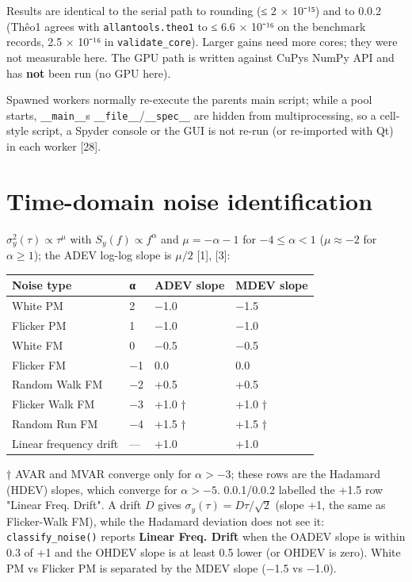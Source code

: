 \documentclass[10pt,a4paper]{article}
\begin{document}
Results are identical to the serial path to rounding (≤ 2 × 10⁻¹⁵) and to
0.0.2 (Thêo1 agrees with \texttt{allantools.\allowbreak{}theo1} to ≤ 6.6 × 10⁻¹⁶ on the benchmark
records, 2.5 × 10⁻¹⁶ in \texttt{validate\_\allowbreak{}core}). Larger gains
need more cores; they were not measurable here. The GPU path is written
against CuPy\textquotesingle s NumPy API and has \textbf{not} been run (no GPU here).

Spawned workers normally re-execute the parent\textquotesingle s main script; while a pool
starts, \texttt{\_\allowbreak{}\_\allowbreak{}main\_\allowbreak{}\_}\textquotesingle s \texttt{\_\allowbreak{}\_\allowbreak{}file\_\allowbreak{}\_}/\texttt{\_\allowbreak{}\_\allowbreak{}spec\_\allowbreak{}\_} are hidden from multiprocessing,
so a cell-style script, a Spyder console or the GUI is not re-run (or
re-imported with Qt) in each worker {[}28{]}.


\hypertarget{time-domain-noise-identification}{%
\section{Time-domain noise identification}\label{time-domain-noise-identification}}

\(\sigma_y^2(\tau) \propto \tau^{\mu}\) with \(S_y(f) \propto f^{\alpha}\) and
\(\mu = -\alpha - 1\) for \(-4 \le \alpha < 1\) (\(\mu \approx -2\) for
\(\alpha \ge 1\)); the ADEV log-log slope is \(\mu/2\) {[}1{]}, {[}3{]}:

\begin{longtable}[]{@{}llll@{}}
\toprule\noalign{}
Noise type & α & ADEV slope & MDEV slope \\
\midrule\noalign{}
\endhead
\bottomrule\noalign{}
\endlastfoot
White PM & 2 & −1.0 & −1.5 \\
Flicker PM & 1 & −1.0 & −1.0 \\
White FM & 0 & −0.5 & −0.5 \\
Flicker FM & −1 & 0.0 & 0.0 \\
Random Walk FM & −2 & +0.5 & +0.5 \\
Flicker Walk FM & −3 & +1.0 † & +1.0 † \\
Random Run FM & −4 & +1.5 † & +1.5 † \\
Linear frequency drift & --- & +1.0 & +1.0 \\
\end{longtable}

† AVAR and MVAR converge only for \(\alpha > -3\); these rows are the Hadamard
(HDEV) slopes, which converge for \(\alpha > -5\). 0.0.1/0.0.2 labelled the +1.5
row "Linear Freq. Drift". A drift \(D\) gives \(\sigma_y(\tau) = D\tau/\sqrt{2}\)
(slope +1, the same as Flicker-Walk FM), while the Hadamard deviation does not
see it: \texttt{classify\_\allowbreak{}noise()} reports \textbf{Linear Freq. Drift} when the OADEV slope
is within 0.3 of +1 and the OHDEV slope is at least 0.5 lower (or OHDEV is
zero). White PM vs Flicker PM is separated by the MDEV slope (−1.5 vs −1.0).
\end{document}
